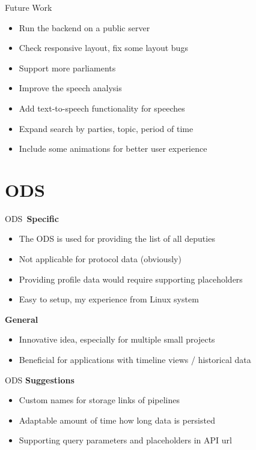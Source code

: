 \documentclass{beamer}
\begin{document}
  \begin{frame}[plain]{Future Work}
    \begin{itemize}
      \item[\footnotesize{\faWarning}]\enspace{}Run the backend on a public server
      \item[\footnotesize{\faWarning}]\enspace{}Check responsive layout, fix some layout bugs
      \item[\footnotesize{\faStar}]\enspace{}Support more parliaments
      \item[\footnotesize{\faStar}]\enspace{}Improve the speech analysis
      \item[\footnotesize{\faStar}]\enspace{}Add text-to-speech functionality for speeches
      \item[\footnotesize{\faStar}]\enspace{}Expand search by parties, topic, period of time 
      \item[\footnotesize{\faStar}]\enspace{}Include some animations for better user experience
    \end{itemize}
  \end{frame}

  \section{ODS}
  \begin{frame}[plain]{ODS}
    \,\textbf{\faUser}\quad\textbf{Specific}
    \begin{itemize}
      \item The ODS is used for providing the list of all deputies
      \item Not applicable for protocol data (obviously)
      \item Providing profile data would require supporting placeholders
      \item Easy to setup, my experience from Linux system
    \end{itemize}
    \textbf{\faUsers}\quad\textbf{General}
    \begin{itemize}
      \item Innovative idea, especially for multiple small projects
      \item Beneficial for applications with timeline views / historical data 
    \end{itemize} 
  \end{frame}

  \begin{frame}[plain]{ODS}
    \textbf{\faThumbsUp}\quad\textbf{Suggestions}
    \begin{itemize}
      \item Custom names for storage links of pipelines
      \item Adaptable amount of time how long data is persisted
      \item Supporting query parameters and placeholders in API url 
    \end{itemize} 
  \end{frame}
\end{document}
